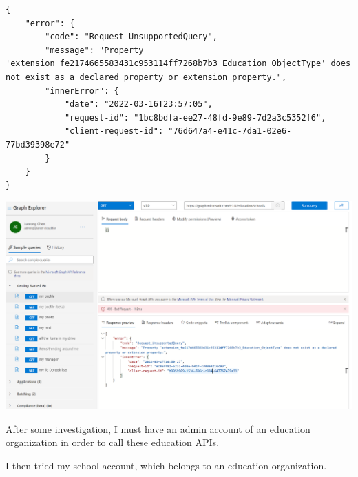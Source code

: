 \documentclass[a4paper]{report}
\begin{document}
\begin{verbatim}
{
    "error": {
        "code": "Request_UnsupportedQuery",
        "message": "Property 'extension_fe2174665583431c953114ff7268b7b3_Education_ObjectType' does not exist as a declared property or extension property.",
        "innerError": {
            "date": "2022-03-16T23:57:05",
            "request-id": "1bc8bdfa-ee27-48fd-9e89-7d2a3c5352f6",
            "client-request-id": "76d647a4-e41c-7da1-02e6-77bd39398e72"
        }
    }
}
\end{verbatim}

\includegraphics[width=\textwidth, height=\textheight, keepaspectratio]{GraphExplorerBadRequest}

After some investigation, I must have an admin account of an education organization in order to call these education APIs.

I then tried my school account, which belongs to an education organization.
\end{document}

